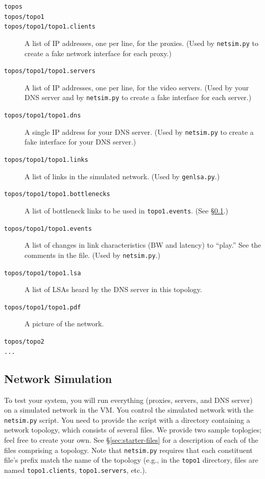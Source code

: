 \documentclass{article}
\begin{document}
\begin{description}
	\item[\texttt{topos}]
	\item[\texttt{topos/topo1}]
	\item[\texttt{topos/topo1/topo1.clients}] A list of IP addresses, one per line, for the proxies. (Used by \texttt{netsim.py} to create a fake network interface for each proxy.)
	\item[\texttt{topos/topo1/topo1.servers}] A list of IP addresses, one per line, for the video servers. (Used by your DNS server and by \texttt{netsim.py} to create a fake interface for each server.)
	\item[\texttt{topos/topo1/topo1.dns}] A single IP address for your DNS server. (Used by \texttt{netsim.py} to create a fake interface for your DNS server.)
	\item[\texttt{topos/topo1/topo1.links}] A list of links in the simulated network. (Used by \texttt{genlsa.py}.)
	\item[\texttt{topos/topo1/topo1.bottlenecks}] A list of bottleneck links to be used in \texttt{topo1.events}. (See \S\ref{sec:netsim}.)
	\item[\texttt{topos/topo1/topo1.events}] A list of changes in link characteristics (BW and latency) to ``play.'' See the comments in the file. (Used by \texttt{netsim.py}.)
	\item[\texttt{topos/topo1/topo1.lsa}] A list of LSAs heard by the DNS server in this topology.
	\item[\texttt{topos/topo1/topo1.pdf}] A picture of the network.
	\item[\texttt{topos/topo2}]
	\item[\texttt{...}]

\end{description}


\subsection{Network Simulation}
\label{sec:netsim}

To test your system, you will run everything (proxies, servers, and DNS server)
on a simulated network in the VM. You control the simulated network with the
\texttt{netsim.py} script. You need to provide the script with a directory
containing a network topology, which consists of several files. We provide two
sample toplogies; feel free to create your own. See \S\ref{sec:starter-files}
for a description of each of the files comprising a topology. Note that
\texttt{netsim.py} requires that each constituent file's prefix match the name
of the topology (e.g., in the \texttt{topo1} directory, files are named
\texttt{topo1.clients}, \texttt{topo1.servers}, etc.).
\end{document}
